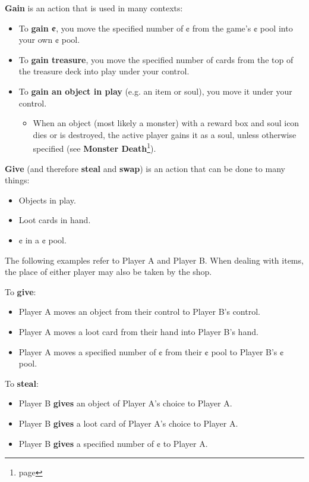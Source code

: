 \documentclass[10pt, a4paper, twoside]{article} %
\begin{document}
    \textbf{Gain} is an action that is used in many contexts:
    \begin{itemize}
        \item To \textbf{gain ¢}, you move the specified number of ¢ from the game’s ¢ pool into your own ¢ pool.
        \item To \textbf{gain treasure}, you move the specified number of cards from the top of the treasure deck into play under your control.
        \item To \textbf{gain an object in play} (e.g. an item or soul), you move it under your control.
        \begin{itemize}
            \item When an object (most likely a monster) with a reward box and soul icon dies or is destroyed, the active player gains it as a soul, unless otherwise specified (see \textbf{Monster Death}\footnote{page \pageref{monsterdeath}}).  
        \end{itemize}
    \end{itemize}
    \textbf{Give} (and therefore \textbf{steal} and \textbf{swap}) is an action that can be done to many things:      
    \begin{itemize}
        \item Objects in play.
        \item Loot cards in hand.
        \item ¢ in a ¢ pool.
    \end{itemize}
    The following examples refer to Player A and Player B. When dealing with items, the place of either player may also be taken by the shop.
    
    To \textbf{give}:
    \begin{itemize}
        \item Player A moves an object from their control to Player B’s control.
        \item Player A moves a loot card from their hand into Player B’s hand.
        \item Player A moves a specified number of ¢ from their ¢ pool to Player B’s ¢ pool.
    \end{itemize}

    To \textbf{steal}:
    \begin{itemize}
        \item Player B \textbf{gives} an object of Player A’s choice to Player A.
        \item Player B \textbf{gives} a loot card of Player A’s choice to Player A.
        \item Player B \textbf{gives} a specified number of ¢ to Player A.
    \end{itemize}
\end{document}
